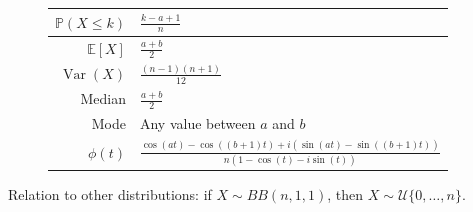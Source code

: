 \documentclass[a4paper,11pt]{article}
\theoremstyle{plain}
\theoremstyle{definition}
\newcommand{\ME}{\mathbb{E}}
\newcommand{\MP}{\mathbb{P}}
\newcommand{\Var}{\operatorname{Var}}
\begin{document}
\begin{figure}[!htb]
\begin{minipage}{0.4\textwidth}
\begin{tabular}{| r | l |}
				\hline
				$\MP(X \leq k)$ & $\frac{k-a+1}{n}$ \\
				\hline
				$\ME[X]$ & $ \frac{a+b}{2} $ \\
				\hline
				$\Var(X)$ & $ \frac{(n-1)(n+1)}{12}$\\
				\hline
				Median & $\frac{a+b}{2}$ \\
				\hline
				Mode & Any value between $a$ and $b$ \\
				\hline
				$\phi(t)$ & $\frac{\cos(at)-\cos((b+1)t)+i(\sin(at)-\sin((b+1)t))}{n(1-\cos(t)-i\sin(t))}$ \\
				\hline
			\end{tabular}
		\end{minipage}
	\end{figure}
	
	Relation to other distributions: if $X \sim BB(n, 1, 1)$, then $X \sim \mathcal{U}\{0, \dots, n\}$.
	
	\pagebreak
\end{document}
